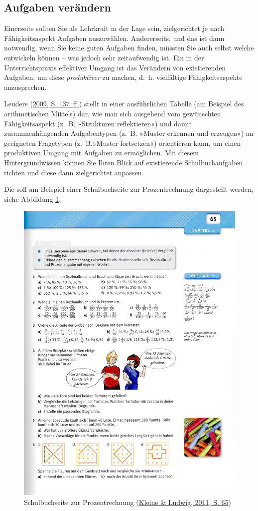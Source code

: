 \documentclass[
]{scrbook}
\theoremstyle{definition}
\theoremstyle{definition}
\theoremstyle{definition}
\theoremstyle{definition}
\theoremstyle{remark}
\begin{document}
\hypertarget{aufgaben-veruxe4ndern}{%
\subsection{Aufgaben verändern}\label{aufgaben-veruxe4ndern}}

Einerseits sollten Sie als Lehrkraft in der Lage sein, zielgerichtet je nach Fähigkeitsaspekt Aufgaben auszuwählen. Andererseits, und das ist dann notwendig, wenn Sie keine guten Aufgaben finden, müssten Sie auch selbst welche entwickeln können -- was jedoch sehr zeitaufwendig ist. Ein in der Unterrichtspraxis effektiver Umgang ist das Verändern von existierenden Aufgaben, um diese \emph{produktiver} zu machen, d.~h. vielfältige Fähigkeitsaspekte anzusprechen.

Leuders (\protect\hyperlink{ref-Leuders2009}{2009, S. 137~ff.}) stellt in einer ausführlichen Tabelle (am Beispiel des arithmetischen Mittels) dar, wie man sich ausgehend vom gewünschten Fähigkeitsaspekt (z.~B. »Strukturen reflektieren«) und damit zusammenhängenden Aufgabentypen (z.~B. »Muster erkennen und erzeugen«) an geeigneten Fragetypen (z.~B.»Muster fortsetzen«) orientieren kann, um einen produktiven Umgang mit Aufgaben zu ermöglichen. Mit diesem Hintergrundwissen können Sie Ihren Blick auf existierende Schulbuchaufgaben richten und diese dann zielgerichtet anpassen.

Die soll am Beispiel einer Schulbuchseite zur Prozentrechnung dargestellt werden, siehe Abbildung \ref{fig:ProzentSchulbuch}.



\begin{figure}

{\centering \includegraphics[width=0.75\linewidth]{pictures/8-ProzentSchulbuch} 

}

\caption{Schulbuchseite zur Prozentrechnung (\protect\hyperlink{ref-Kleine2011a}{Kleine \& Ludwig, 2011, S. 65})}\label{fig:ProzentSchulbuch}
\end{figure}
\end{document}
